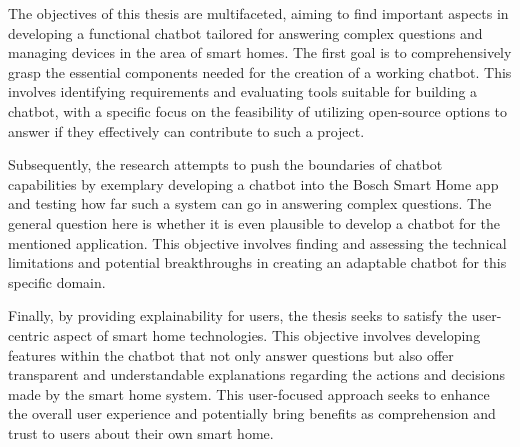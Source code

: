 

The objectives of this thesis are multifaceted, aiming to find important aspects in developing a functional chatbot tailored for answering complex questions and managing devices in the area of smart homes. The first goal is to comprehensively grasp the essential components needed for the creation of a working chatbot. This involves identifying requirements and evaluating tools suitable for building a chatbot, with a specific focus on the feasibility of utilizing open-source options to answer if they effectively can contribute to such a project.

Subsequently, the research attempts to push the boundaries of chatbot capabilities by exemplary developing a chatbot into the Bosch Smart Home app and testing how far such a system can go in answering complex questions. The general question here is whether it is even plausible to develop a chatbot for the mentioned application. This objective involves finding and assessing the technical limitations and potential breakthroughs in creating an adaptable chatbot for this specific domain.

Finally, by providing explainability for users, the thesis seeks to satisfy the user-centric aspect of smart home technologies. This objective involves developing features within the chatbot that not only answer questions but also offer transparent and understandable explanations regarding the actions and decisions made by the smart home system. This user-focused approach seeks to enhance the overall user experience and potentially bring benefits as comprehension and trust to users about their own smart home. 

